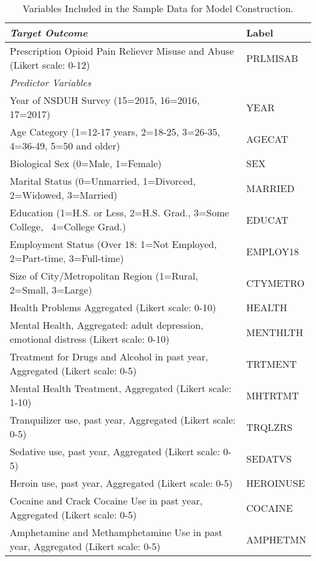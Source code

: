 \documentclass[sigconf]{acmart}
\begin{document}
\begin{table*}[ht]
  \caption{Variables Included in the Sample Data for Model Construction.}
  \label{tab:freq}
  \begin{tabular}{ll}
    \toprule
    \textit{Target Outcome} & Label \\
    \midrule
    Prescription Opioid Pain Reliever Misuse and Abuse 
    (Likert scale: 0-12)& PRLMISAB  \\
    \midrule
    \textit{Predictor Variables}&   \\
    \midrule
    Year of NSDUH Survey (15=2015, 16=2016, 17=2017) & YEAR  \\
    Age Category (1=12-17 years, 2=18-25, 3=26-35, 4=36-49, 5=50 and older)& AGECAT \\
    Biological Sex (0=Male, 1=Female)& SEX  \\
    Marital Status (0=Unmarried, 1=Divorced, 2=Widowed, 3=Married)& MARRIED  \\
    Education (1=H.S. or Less, 2=H.S. Grad., 3=Some College,  4=College Grad.)& EDUCAT  \\
    Employment Status (Over 18: 1=Not Employed, 2=Part-time, 3=Full-time) & EMPLOY18  \\
    Size of City/Metropolitan Region (1=Rural, 2=Small, 3=Large)& CTYMETRO  \\
    Health Problems Aggregated  (Likert scale: 0-10)& HEALTH  \\
    Mental Health, Aggregated: adult depression, emotional distress 
    (Likert scale: 0-10)& MENTHLTH  \\
    Treatment for Drugs and Alcohol in past year, Aggregated 
    (Likert scale: 0-5)& TRTMENT  \\
    Mental Health Treatment, Aggregated (Likert scale: 1-10)& MHTRTMT  \\
    Tranquilizer use, past year, Aggregated (Likert scale: 0-5)& TRQLZRS \\
    Sedative use, past year, Aggregated (Likert scale: 0-5)& SEDATVS  \\
    Heroin use, past year, Aggregated (Likert scale: 0-5)& HEROINUSE  \\
    Cocaine and Crack Cocaine Use in past year, Aggregated  
    (Likert scale: 0-5)& COCAINE  \\
    Amphetamine and Methamphetamine Use in past year, Aggregated 
    (Likert scale: 0-5)& AMPHETMN  \\
    \bottomrule
  \end{tabular}
\end{table*}
\end{document}
